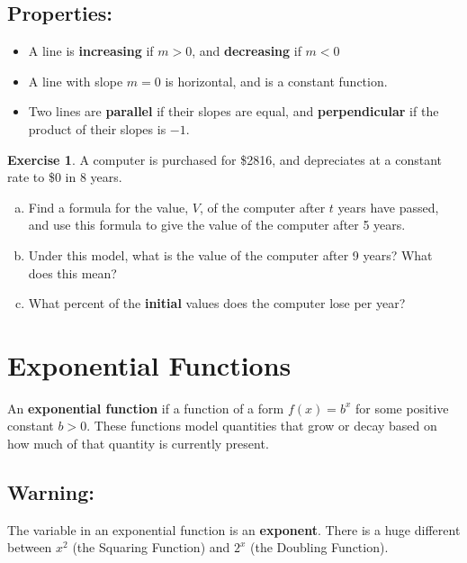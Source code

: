 \documentclass[11pt,reqno,final]{amsart}
\numberwithin{equation}{section}
\numberwithin{figure}{section}
\theoremstyle{definition} %
\newtheorem{exercise}[question]{Exercise}
\begin{document}
\subsection*{Properties:}
\begin{itemize}
\item A line is \textbf{increasing} if $m > 0$, and \textbf{decreasing} if $m < 0$
\item A line with slope $m = 0$ is horizontal, and is a constant function.
\item Two lines are \textbf{parallel} if their slopes are equal, and \textbf{perpendicular} if the product of their slopes is $-1$.
\end{itemize}


\begin{exercise}
        \label{computerex}
        A computer is purchased for \$2816, and depreciates at a constant rate to \$0 in 8 years.
        \begin{enumerate}[(a)]
        \item  Find a formula for the value, $V$, of the computer after $t$ years have passed, and
                use this formula to give the value of the computer after 5 years.
                \vfill
                \vfill
        \item Under this model, what is the value of the computer after 9 years? What does this mean?
                \vfill
        \item What percent of the \textbf{initial} values does the computer lose per year?
                \vfill
        \end{enumerate}
\end{exercise}

\newpage

\section{Exponential Functions}

\begin{framed}
        An \textbf{exponential function} if a function of a form $f(x) = b^x$ for some positive constant $b > 0$.
        These functions model quantities that grow or decay based on how much of that quantity is currently present.
\end{framed}

\subsection*{Warning:} The variable in an exponential function is an \textbf{exponent}.
There is a huge different between
$x^2$ (the Squaring Function) and $2^x$ (the Doubling Function).\\
\end{document}
